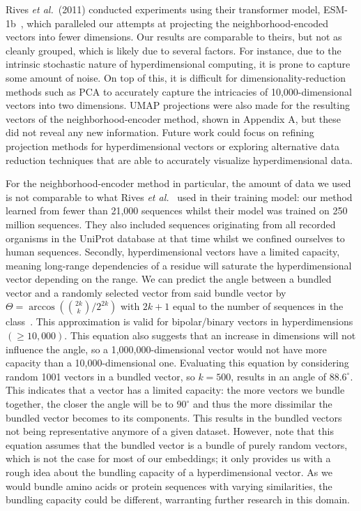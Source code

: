 Rives \textit{et al.}~(2011) conducted experiments using their transformer model, ESM-1b~\cite{esm}, which paralleled our attempts at projecting the neighborhood-encoded vectors into fewer dimensions. Our results are comparable to theirs, but not as cleanly grouped, which is likely due to several factors. For instance, due to the intrinsic stochastic nature of hyperdimensional computing, it is prone to capture some amount of noise. On top of this, it is difficult for dimensionality-reduction methods such as PCA to accurately capture the intricacies of 10,000-dimensional vectors into two dimensions. UMAP projections were also made for the resulting vectors of the neighborhood-encoder method, shown in Appendix A, but these did not reveal any new information. Future work could focus on refining projection methods for hyperdimensional vectors or exploring alternative data reduction techniques that are able to accurately visualize hyperdimensional data. 

For the neighborhood-encoder method in particular, the amount of data we used is not comparable to what Rives \textit{et al.}~\cite{esm} used in their training model: our method learned from fewer than 21,000 sequences whilst their model was trained on 250 million sequences. They also included sequences originating from all recorded organisms in the UniProt database at that time whilst we confined ourselves to human sequences. Secondly, hyperdimensional vectors have a limited capacity, meaning long-range dependencies of a residue will saturate the hyperdimensional vector depending on the range. We can predict the angle between a bundled vector and a randomly selected vector from said bundle vector by $\Theta = \arccos({2k \choose k}/2^{2k})$ with $2k+1$ equal to the number of sequences in the class~\cite{sathdv}. This approximation is valid for bipolar/binary vectors in hyperdimensions $(\ge 10,000)$. This equation also suggests that an increase in dimensions will not influence the angle, so a 1,000,000-dimensional vector would not have more capacity than a 10,000-dimensional one. Evaluating this equation by considering random 1001 vectors in a bundled vector, so $k = 500$, results in an angle of $88.6^{\circ}$. This indicates that a vector has a limited capacity: the more vectors we bundle together, the closer the angle will be to $90^{\circ}$ and thus the more dissimilar the bundled vector becomes to its components. This results in the bundled vectors not being representative anymore of a given dataset. However, note that this equation assumes that the bundled vector is a bundle of purely random vectors, which is not the case for most of our embeddings; it only provides us with a rough idea about the bundling capacity of a hyperdimensional vector. As we would bundle amino acids or protein sequences with varying similarities, the bundling capacity could be different, warranting further research in this domain.

